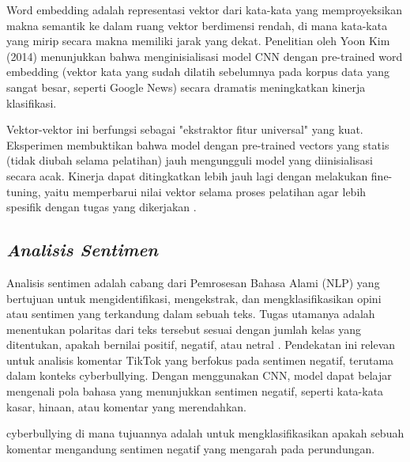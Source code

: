 Word embedding adalah representasi vektor dari kata-kata yang memproyeksikan makna semantik ke dalam ruang vektor berdimensi rendah, di mana kata-kata yang mirip secara makna memiliki jarak yang dekat. Penelitian oleh Yoon Kim (2014) menunjukkan bahwa menginisialisasi model CNN dengan pre-trained word embedding (vektor kata yang sudah dilatih sebelumnya pada korpus data yang sangat besar, seperti Google News) secara dramatis meningkatkan kinerja klasifikasi. 

Vektor-vektor ini berfungsi sebagai "ekstraktor fitur universal" yang kuat. Eksperimen membuktikan bahwa model dengan pre-trained vectors yang statis (tidak diubah selama pelatihan) jauh mengungguli model yang diinisialisasi secara acak. Kinerja dapat ditingkatkan lebih jauh lagi dengan melakukan fine-tuning, yaitu memperbarui nilai vektor selama proses pelatihan agar lebih spesifik dengan tugas yang dikerjakan \cite{kim2014temporal}. \par

\subsection{\textit{Analisis Sentimen}} \label{II.teori3}

Analisis sentimen adalah cabang dari Pemrosesan Bahasa Alami (NLP) yang bertujuan untuk mengidentifikasi, mengekstrak, dan mengklasifikasikan opini atau sentimen yang terkandung dalam sebuah teks. Tugas utamanya adalah menentukan polaritas dari teks tersebut sesuai dengan jumlah kelas yang ditentukan, apakah bernilai positif, negatif, atau netral \cite{liao2017cnn}. Pendekatan ini relevan untuk analisis komentar TikTok yang berfokus pada sentimen negatif, terutama dalam konteks cyberbullying. Dengan menggunakan CNN, model dapat belajar mengenali pola bahasa yang menunjukkan sentimen negatif, seperti kata-kata kasar, hinaan, atau komentar yang merendahkan. \par

cyberbullying di mana tujuannya adalah untuk mengklasifikasikan apakah sebuah komentar mengandung sentimen negatif yang mengarah pada perundungan.

